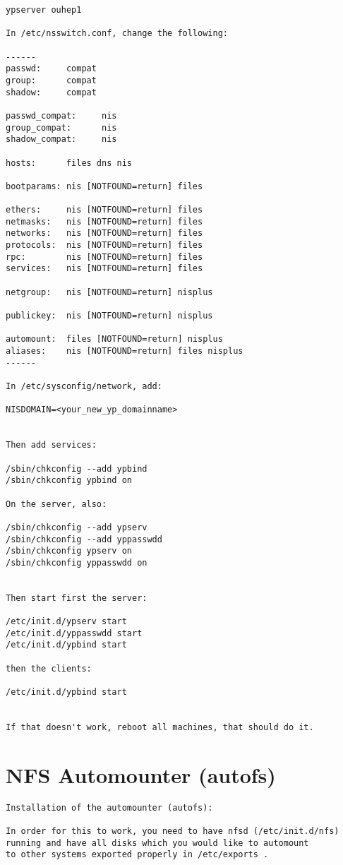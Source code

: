 \documentclass{revtex4}
\begin{document}
\begin{appendix}
\begin{verbatim}
ypserver ouhep1

In /etc/nsswitch.conf, change the following:

------
passwd:     compat
group:      compat
shadow:     compat

passwd_compat:     nis
group_compat:      nis
shadow_compat:     nis

hosts:      files dns nis

bootparams: nis [NOTFOUND=return] files

ethers:     nis [NOTFOUND=return] files
netmasks:   nis [NOTFOUND=return] files
networks:   nis [NOTFOUND=return] files
protocols:  nis [NOTFOUND=return] files
rpc:        nis [NOTFOUND=return] files
services:   nis [NOTFOUND=return] files

netgroup:   nis [NOTFOUND=return] nisplus

publickey:  nis [NOTFOUND=return] nisplus

automount:  files [NOTFOUND=return] nisplus
aliases:    nis [NOTFOUND=return] files nisplus
------

In /etc/sysconfig/network, add:

NISDOMAIN=<your_new_yp_domainname>


Then add services:

/sbin/chkconfig --add ypbind
/sbin/chkconfig ypbind on

On the server, also:

/sbin/chkconfig --add ypserv
/sbin/chkconfig --add yppasswdd
/sbin/chkconfig ypserv on
/sbin/chkconfig yppasswdd on


Then start first the server:

/etc/init.d/ypserv start
/etc/init.d/yppasswdd start
/etc/init.d/ypbind start

then the clients:

/etc/init.d/ypbind start


If that doesn't work, reboot all machines, that should do it.
\end{verbatim}

\newpage

\section{NFS Automounter (autofs) \label{autofs}}
\begin{verbatim}
Installation of the automounter (autofs):

In order for this to work, you need to have nfsd (/etc/init.d/nfs)
running and have all disks which you would like to automount 
to other systems exported properly in /etc/exports .


\end{verbatim}
\end{appendix}
\end{document}
